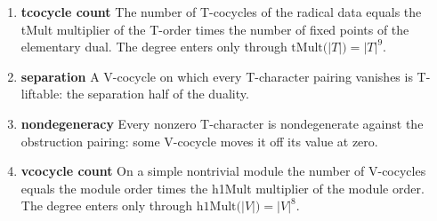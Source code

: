 \begin{enumerate}
\item[(1)] \textbf{tcocycle count} The number of T-cocycles of the radical data equals the tMult multiplier of the T-order times the number of fixed points of the elementary dual. The degree enters only through $\mathrm{tMult}\bigl(\lvert T\rvert\bigr)=\lvert T\rvert^{9}$.
\item[(2)] \textbf{separation} A V-cocycle on which every T-character pairing vanishes is T-liftable: the separation half of the duality.
\item[(3)] \textbf{nondegeneracy} Every nonzero T-character is nondegenerate against the obstruction pairing: some V-cocycle moves it off its value at zero.
\item[(4)] \textbf{vcocycle count} On a simple nontrivial module the number of V-cocycles equals the module order times the h1Mult multiplier of the module order. The degree enters only through $\mathrm{h1Mult}\bigl(\lvert V\rvert\bigr)=\lvert V\rvert^{8}$.
\end{enumerate}

